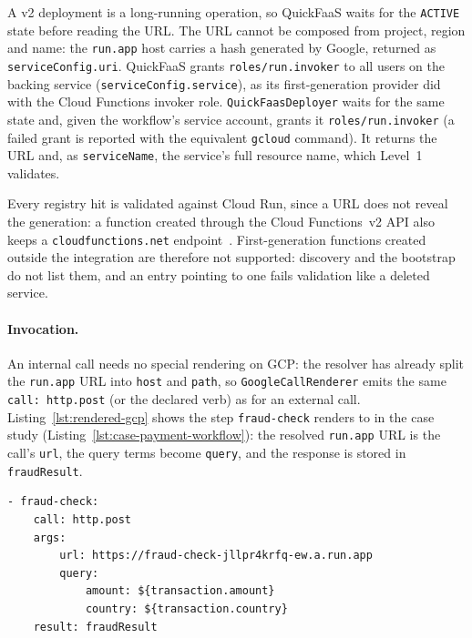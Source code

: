 A v2 deployment is a long-running operation, so QuickFaaS waits for the \texttt{ACTIVE} state before
reading the URL. The URL cannot be composed from project, region and name: the \texttt{run.app} host
carries a hash generated by Google, returned as \texttt{serviceConfig.uri}. QuickFaaS grants
\texttt{roles/\allowbreak run.invoker} to all users on the backing service
(\texttt{serviceConfig.service}), as its first-generation provider did with the Cloud Functions
invoker role. \texttt{QuickFaasDeployer} waits for the same state and, given the workflow's service
account, grants it \texttt{roles/\allowbreak run.invoker} (a failed grant is reported with the
equivalent \texttt{gcloud} command). It returns the URL and, as \texttt{serviceName}, the service's
full resource name, which Level~1 validates.

Every registry hit is validated against Cloud Run, since a URL does not reveal the generation: a
function created through the Cloud Functions~v2 API also keeps a \texttt{cloudfunctions.net}
endpoint~\cite{gcpFunctionsVersionComparison}. First-generation functions created outside the
integration are therefore not supported: discovery and the bootstrap do not list them, and an entry
pointing to one fails validation like a deleted service.

\paragraph{Invocation.}
An internal call needs no special rendering on GCP: the resolver has already split the
\texttt{run.app} URL into \texttt{host} and \texttt{path}, so \texttt{GoogleCallRenderer} emits the
same \texttt{call: http.post} (or the declared verb) as for an external call.
Listing~\ref{lst:rendered-gcp} shows the step \texttt{fraud-check} renders to in the case study
(Listing~\ref{lst:case-payment-workflow}): the resolved \texttt{run.app} URL is the call's
\texttt{url}, the query terms become \texttt{query}, and the response is stored in
\texttt{fraudResult}.

\begin{lstlisting}[caption={Cloud Workflows step rendered for the internal call \texttt{fraud-check}, from the case study run on GCP.},label={lst:rendered-gcp},float=htbp,language={},basicstyle=\ttfamily\small,breaklines=false]
- fraud-check:
    call: http.post
    args:
        url: https://fraud-check-jllpr4krfq-ew.a.run.app
        query:
            amount: ${transaction.amount}
            country: ${transaction.country}
    result: fraudResult
\end{lstlisting}

